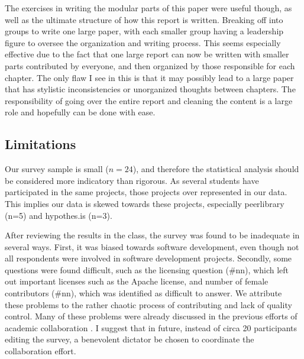 The exercises in writing the modular parts of this paper were useful though, as well as the ultimate structure of how this report is written. Breaking off into groups to write one large paper, with each smaller group having a leadership figure to oversee the organization and writing process. This seems especially effective due to the fact that one large report can now be written with smaller parts contributed by everyone, and then organized by those responsible for each chapter. The only flaw I see in this is that it may possibly lead to a large paper that has stylistic inconsistencies or unorganized thoughts between chapters. The responsibility of going over the entire report and cleaning the content is a large role and hopefully can be done with ease. 

\subsection{Limitations}
\label{sec:limitations}
Our survey sample is small ($n=24$), and therefore the statistical analysis should be considered more indicatory than rigorous. As several students have participated in the same projects, those projects over represented in our data. This implies our data is skewed towards these projects, especially peerlibrary (n=5) and hypothes.is (n=3).

After reviewing the results in the class, the survey was found to be inadequate in several ways. First, it was biased towards software development, even though not all respondents were involved in software development projects. Secondly, some questions were found difficult, such as the licensing question (\#nn), which left out important licenses such as the Apache license, and number of female contributors (\#nn), which was identified as difficult to answer. We attribute these problems to the rather chaotic process of contributing and lack of quality control.  Many of these problems were already discussed in the previous efforts of academic collaboration \cite{Tomlinson2012}. I suggest that in future, instead of circa 20 participants editing the survey, a benevolent dictator be chosen to coordinate the collaboration effort.


